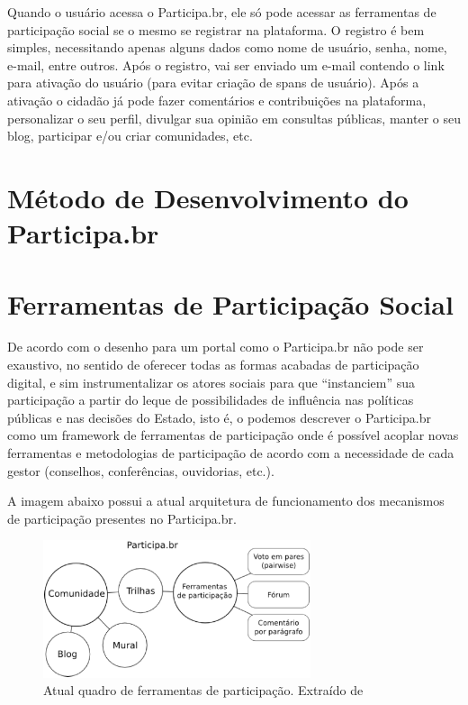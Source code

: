 %

Quando o usuário acessa o Participa.br, ele só pode acessar as ferramentas de participação social se o mesmo se registrar na plataforma. O registro é bem simples, necessitando apenas alguns dados como nome de usuário, senha, nome, e-mail, entre outros. Após o registro, vai ser enviado um e-mail contendo o link para ativação do usuário (para evitar criação de spans de usuário). Após a ativação o cidadão já pode fazer comentários e contribuições na plataforma, personalizar o seu perfil, divulgar sua opinião em consultas públicas, manter o seu blog, participar e/ou criar comunidades, etc.

\section{Método de Desenvolvimento do Participa.br}

\section{Ferramentas de Participação Social}

De acordo com \cite{solagna2014metodologias} o desenho para um portal como o Participa.br não pode ser exaustivo, no sentido de oferecer todas as formas acabadas de participação digital, e sim instrumentalizar os atores sociais para que “instanciem” sua participação a partir do leque de possibilidades de influência nas políticas públicas e nas decisões do Estado, isto é, o podemos descrever o Participa.br como um framework de ferramentas de participação onde é possível acoplar novas ferramentas e metodologias de participação de acordo com a necessidade de cada gestor (conselhos, conferências, ouvidorias, etc.).

%

A imagem abaixo possui a atual arquitetura de funcionamento dos mecanismos de participação presentes no Participa.br. 

\graphicspath{{figuras/}}
\begin{figure}[H]
\centering
\includegraphics[width=0.7\textwidth]{arquitetura-ferramentas-participa}
\caption{Atual quadro de ferramentas de participação. Extraído de \cite{solagna2014metodologias}}
\label{fig:arquiteturaparticipa}
\end{figure}
















